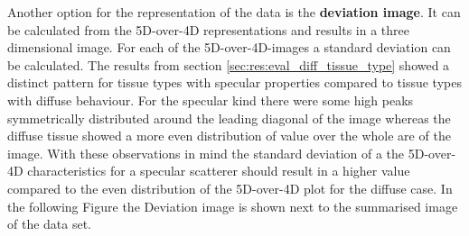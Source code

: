 Another option for the representation of the data is the \textbf{deviation image}. It can be calculated from the 5D-over-4D representations and results in a three dimensional image. For each of the 5D-over-4D-images a standard deviation can be calculated. The results from section \ref{sec:res:eval_diff_tissue_type} showed a distinct pattern for tissue types with specular properties compared to tissue types with diffuse behaviour. For the specular kind there were some high peaks symmetrically distributed around the leading diagonal of the image whereas the diffuse tissue showed a more even distribution of value over the whole are of the image. With these observations in mind the standard deviation of a the 5D-over-4D characteristics for a specular scatterer should result in a higher value compared to the even distribution of the 5D-over-4D plot for the diffuse case. In the following Figure the Deviation image is shown next to the summarised image of the data set.


